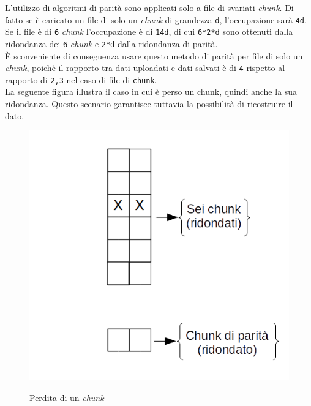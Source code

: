 L'utilizzo di algoritmi di parit\`{a} sono applicati solo a file di svariati \textit{chunk}. Di fatto se \`{e} caricato un file di solo un \textit{chunk} di grandezza \verb"d", l'occupazione sar\`{a} \verb"4d". Se il file \`{e} di \verb"6" \textit{chunk} l'occupazione \`{e} di \verb"14d", di cui \verb"6*2*d" sono ottenuti dalla ridondanza dei \verb"6" \textit{chunk} e \verb"2*d" dalla ridondanza di parit\`{a}.\\
\`{E} sconveniente di conseguenza usare questo metodo di parit\`{a} per file di solo un \textit{chunk}, poich\`{e} il rapporto tra dati uploadati e dati salvati \`{e} di \verb"4" rispetto al rapporto di \verb"2,3" nel caso di file di \verb"chunk".\\
La seguente figura illustra il caso in cui \`{e} perso un chunk, quindi anche la sua ridondanza. Questo scenario garantisce tuttavia la possibilit\`{a} di ricostruire il dato.

\begin{figure}[htbp]
\centering
\includegraphics[scale=0.55]{img/chunk1.png}\\
\caption{Perdita di un \textit{chunk} \label{figura1.21}}
\end{figure}

